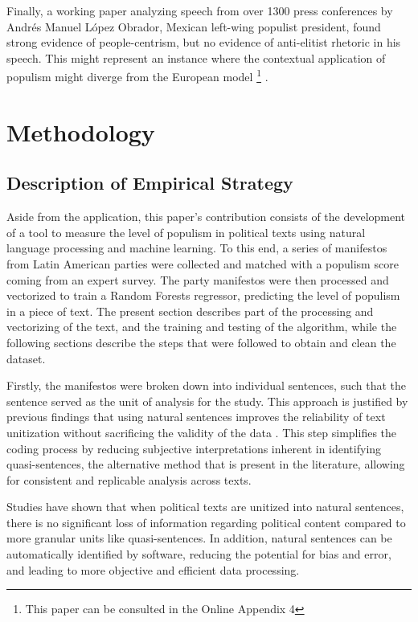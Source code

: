 \documentclass[12pt,letterpaper]{article}
\begin{document}
Finally, a working paper analyzing speech from over 1300 press conferences by Andrés Manuel López Obrador, Mexican left-wing populist president, found strong evidence of people-centrism, but no evidence of anti-elitist rhetoric in his speech. This might represent an instance where the contextual application of populism might diverge from the European model 
\footnote{This paper can be consulted in the Online Appendix 4} .

\section{Methodology} 

\vspace{.25cm}
\subsection{Description of Empirical Strategy}

\vspace{.25cm}
\noindent Aside from the application, this paper's contribution consists of the development of a tool to measure the level of populism in political texts using natural language processing and machine learning. To this end, a series of manifestos from Latin American parties were collected and matched with a populism score coming from an expert survey. The party manifestos were then processed and vectorized to train a Random Forests regressor, predicting the level of populism in a piece of text. The present section describes part of the processing and vectorizing of the text, and the training and testing of the algorithm, while the following sections describe the steps that were followed to obtain and clean the dataset. 

Firstly, the manifestos were broken down into individual sentences, such that the sentence served as the unit of analysis for the study. This approach is justified by previous findings that using natural sentences improves the reliability of text unitization without sacrificing the validity of the data\autocite{daublerNaturalSentencesValid2012} . This step simplifies the coding process by reducing subjective interpretations inherent in identifying quasi-sentences, the alternative method that is present in the literature, allowing for consistent and replicable analysis across texts. 

Studies have shown that when political texts are unitized into natural sentences, there is no significant loss of information regarding political content compared to more granular units like quasi-sentences. In addition, natural sentences can be automatically identified by software, reducing the potential for bias and error, and leading to more objective and efficient data processing\autocite{daublerNaturalSentencesValid2012}. 
\end{document}
